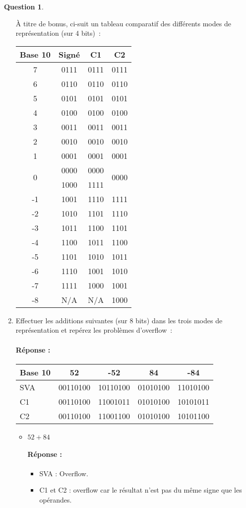 \documentclass[11pt,a4paper]{article}
\theoremstyle{definition}%
\newtheorem{Q}{Question}[] %
\newcommand{\reponse}[1]{%
	\ifthenelse {\boolean{corrige}} {\paragraph{Réponse :} \color{darkblue}   #1\color{black}} {}
 }
\begin{document}
\begin{Q}
\begin{enumerate}
{		À titre de bonus, ci-suit un tableau comparatif des différents modes de représentation (sur 4 bits)~:
		\begin{center}
			\begin{tabular}{|c|c|c|c|} \hline
				Base 10 & Signé & C1 & C2 \\ \hline
				7 & 0111 & 0111 & 0111 \\ \hline
				6 & 0110 & 0110 & 0110 \\ \hline
				5 & 0101 & 0101 & 0101 \\ \hline
				4 & 0100 & 0100 & 0100 \\ \hline
				3 & 0011 & 0011 & 0011 \\ \hline
				2 & 0010 & 0010 & 0010 \\ \hline
				1 & 0001 & 0001 & 0001 \\ \hline
				\multirow{2}{*}{0} & 0000 & 0000 & \multirow{2}{*}{0000} \\
				& 1000 & 1111 & \\ \hline
				-1 & 1001 & 1110 & 1111 \\ \hline
				-2 & 1010 & 1101 & 1110 \\ \hline
				-3 & 1011 & 1100 & 1101 \\ \hline
				-4 & 1100 & 1011 & 1100 \\ \hline
				-5 & 1101 & 1010 & 1011 \\ \hline
				-6 & 1110 & 1001 & 1010 \\ \hline
				-7 & 1111 & 1000 & 1001 \\ \hline
				-8 & N/A & N/A & 1000 \\ \hline
			\end{tabular}
		\end{center}
	}
	\item Effectuer les additions suivantes (sur 8 bits) dans les trois modes de représentation et repérez les problèmes d'overflow~:
	\reponse{
		\begin{tabular}{|l|c|c|c|c|} \hline
		Base 10 & 52 & -52 & 84 & -84 \\ \hline
		SVA & 00110100 & 10110100 & 01010100 & 11010100 \\ \hline
		C1 & 00110100 & 11001011 & 01010100 & 10101011 \\ \hline
		C2 & 00110100 & 11001100 & 01010100 & 10101100 \\ \hline
		\end{tabular}
	}
		\begin{itemize}
			\item $52 + 84$
			\reponse{
			\begin{itemize}
				\item SVA : Overflow.
				\item C1 et C2 : overflow car le résultat n'est pas du même signe que les opérandes.
			\end{itemize}
			}


\end{itemize}
\end{enumerate}
\end{Q}
\end{document}
